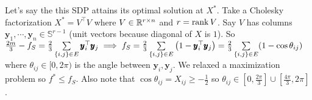 Let's say the this SDP attains its optimal solution at $X^{*}$. Take a Cholesky factorization $X^{*} = V^{\top}V$ where $V\in \mathbb{R}^{r\times n}$ and $r=\operatorname{rank} V$. Say $V$ has columns $\pmb y_{1},\cdots, \pmb y_{n}\in \mathbb S^{r-1}$ (unit vectors because diagonal of $X$ is $1$). So $\frac{2m}3 - f_{S} = \frac{2}{3} \sum \limits_{\left\{i,j\right\}\in E} \pmb y_{i}^{\top}\pmb y_{j}\implies f_{S} = \frac{2}{3}\sum \limits_{\left\{i,j\right\}\in E} \left(1-\pmb y_{i}^{\top}\pmb y_{j}\right) = \frac23\sum\limits_{\left\{i,j\right\}\in E}(1-\cos\theta_{ij})$ where $\theta_{ij}\in [0,2\pi)$ is the angle between $\pmb y_{i},\pmb y_{j}$. We relaxed a maximization problem so $f^{*}\le f_{S}$. Also note that $\cos\theta_{ij}=X_{ij}\ge -\frac12$ so $\theta_{ij} \in \left[0, \frac{2\pi}{3}\right]\cup\left[\frac{4\pi}3,2\pi\right]$. 

%

